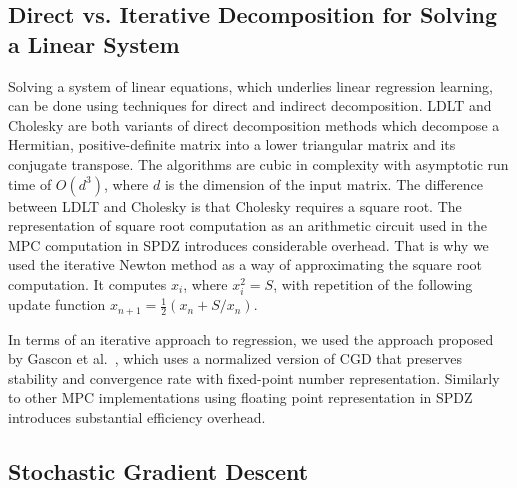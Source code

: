 \documentclass{article}
\begin{document}
\subsection{Direct vs. Iterative Decomposition for Solving a Linear System}

Solving a system of linear equations, which underlies linear regression learning, can be done using techniques for direct and indirect decomposition.
LDLT and Cholesky are both variants of direct decomposition methods which decompose a Hermitian, positive-definite matrix into a lower triangular matrix and its conjugate transpose. The algorithms are cubic in complexity with asymptotic run time of $O(d^3)$, where $d$ is the dimension of the input matrix. 
The difference between LDLT and Cholesky is that Cholesky requires a square root. The representation of square root computation as an arithmetic circuit used in the MPC computation in SPDZ introduces 
considerable overhead. That is why we used the iterative Newton method as a way of approximating the square root computation. It computes $x_i$, where $x_{i}^2 = S$, with repetition of the following
update function $x_{n+1} =\frac{1}{2}(x_{n} + S/x_{n})$.

In terms of an iterative approach to regression, we used the approach proposed by
Gascon et al.~\cite{GSB0DZE17}, which uses a normalized version of CGD that preserves stability and convergence rate with fixed-point number representation. Similarly to other MPC implementations
using floating point representation in SPDZ introduces substantial efficiency overhead. 


\subsection{Stochastic Gradient Descent}
\end{document}
